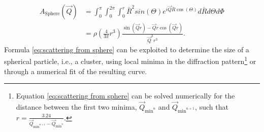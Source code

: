 \begin{align}
A_{\text{Sphere}}\left(\vec{Q}\right) &= \int_{0}^{\pi}\int_{0}^{2\pi}\int_{0}^{r} \bar{R}^{2}  sin\left(\Theta\right) e^{i \vec{Q} \bar{R} \cos\left(\Theta\right)} d\bar{R} d\Theta d\Phi\\
&=\rho\left(\frac{4}{3\pi}r^{3}\right)\frac{\sin\left(\vec{Q} r\right)-\vec{Q} r\cos\left(\vec{Q} r\right)}{\vec{Q}^{3} r^{3}}.
\label{eq:scattering from sphere}
\end{align}
Formula \eqref{eq:scattering from sphere} can be exploited to determine the size of a spherical particle, i.e., a cluster, using local minima in the diffraction pattern\footnote{Equation \eqref{eq:scattering from sphere} can be solved numerically for the distance between the first two minima, $\vec{Q}_{\text{min}^{n}}$ and $\vec{Q}_{\text{min}^{n+1}}$, such that $r=\frac{3.24}{\vec{Q}_{\text{min}^{n+1}}-\vec{Q}_{\text{min}^{n}}}$.} or through a numerical fit of the resulting curve.
%
%
%
%
%
%
